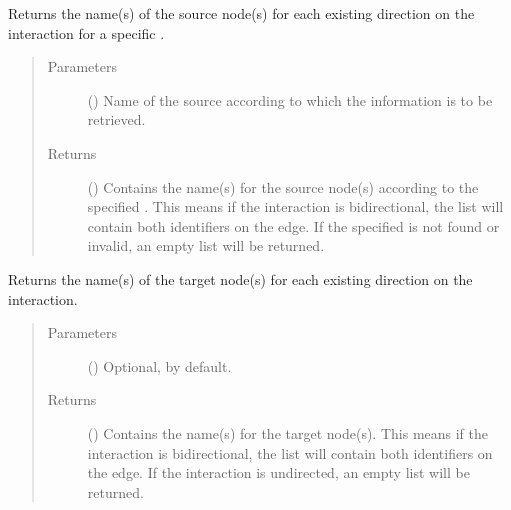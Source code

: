 \documentclass[letterpaper,10pt,english]{sphinxmanual}
\begin{document}
\begin{fulllineitems}

\begin{fulllineitems}
\label{\detokenize{main:pypath.main.Direction.src_by_source}}
Returns the name(s) of the source node(s) for each existing
direction on the interaction for a specific .
\begin{quote}\begin{description}
\item[{Parameters}] \leavevmode
{} () \textendash{} Name of the source according to which the information is to
be retrieved.

\item[{Returns}] \leavevmode
() \textendash{} Contains the name(s) for the source node(s)
according to the specified . This means if the
interaction is bidirectional, the list will contain both
identifiers on the edge. If the specified  is not
found or invalid, an empty list will be returned.

\end{description}\end{quote}

\end{fulllineitems}


\begin{fulllineitems}
\label{\detokenize{main:pypath.main.Direction.tgt}}
Returns the name(s) of the target node(s) for each existing
direction on the interaction.
\begin{quote}\begin{description}
\item[{Parameters}] \leavevmode
{} () \textendash{} Optional,  by default.

\item[{Returns}] \leavevmode
() \textendash{} Contains the name(s) for the target node(s).
This means if the interaction is bidirectional, the list
will contain both identifiers on the edge. If the
interaction is undirected, an empty list will be returned.


\end{description}
\end{quote}
\end{fulllineitems}
\end{fulllineitems}
\end{document}
